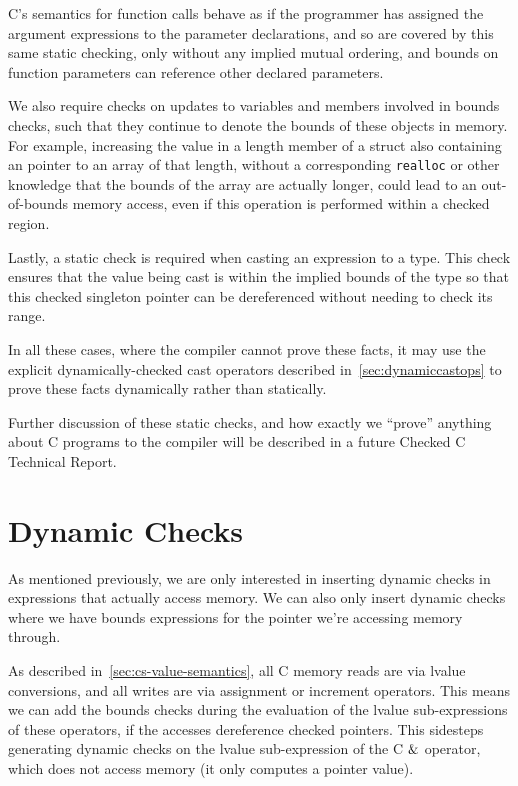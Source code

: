 C's semantics for function calls behave as if the programmer has
assigned the argument expressions to the parameter declarations, and
so are covered by this same static checking, only without any implied
mutual ordering, and bounds on function parameters can reference other
declared parameters.

We also require checks on updates to variables and members involved in
bounds checks, such that they continue to denote the bounds of these
objects in memory. For example, increasing the value in a length
member of a struct also containing an pointer to an array of that
length, without a corresponding \lstinline|realloc| or other knowledge
that the bounds of the array are actually longer, could lead to an
out-of-bounds memory access, even if this operation is performed
within a checked region.

Lastly, a static check is required when casting an expression to a
\PtrT type. This check ensures that the value being cast is within the
implied bounds of the \PtrT type so that this checked singleton
pointer can be dereferenced without needing to check its range.

In all these cases, where the compiler cannot prove these facts, it
may use the explicit dynamically-checked cast operators described
in~\autoref{sec:dynamiccastops} to prove these facts dynamically
rather than statically.

Further discussion of these static checks, and how exactly we
``prove'' anything about C programs to the compiler will be described
in a future Checked C Technical Report.


\section{Dynamic Checks}
\label{sec:dynamic-checks}

As mentioned previously, we are only interested in inserting dynamic
checks in expressions that actually access memory. We can also only
insert dynamic checks where we have bounds expressions for the pointer
we're accessing memory through.

As described in~\autoref{sec:cs-value-semantics}, all C memory reads
are via lvalue conversions, and all writes are via assignment or
increment operators. This means we can add the bounds checks during
the evaluation of the lvalue sub-expressions of these operators, if the
accesses dereference checked pointers. This sidesteps generating
dynamic checks on the lvalue sub-expression of the C $\mathord{\&}$
operator, which does not access memory (it only computes a pointer
value).

